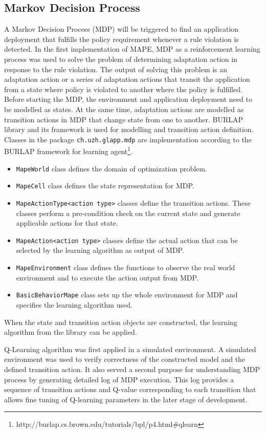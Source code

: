\documentclass{seal_thesis}
\begin{document}
\subsection{Markov Decision Process}\label{sec:mdp}
A Markov Decision Process (MDP) will be triggered to find an application deployment that fulfills the policy requirement whenever a rule violation is detected.
In the first implementation of MAPE, MDP as a reinforcement learning process was used to solve the problem of determining adaptation action in response to the rule violation.
The output of solving this problem is an adaptation action or a series of adaptation actions that transit the application from a state where policy is violated to another where the policy is fulfilled.
Before starting the MDP, the environment and application deployment need to be modelled as states.
At the same time, adaptation actions are modelled as transition actions in MDP that change state from one to another.
BURLAP library and its framework is used for modelling and transition action definition.
Classes in the package \texttt{ch.uzh.glapp.mdp} are implementation according to the BURLAP framework for learning agent\footnote{http://burlap.cs.brown.edu/tutorials/bpl/p4.html\#qlearn}.
\begin{itemize}
\item \texttt{MapeWorld} class defines the domain of optimization problem.
\item \texttt{MapeCell} class defines the state representation for MDP.
\item \texttt{MapeActionType<action type>} classes define the transition actions.
These classes perform a pre-condition check on the current state and generate applicable actions for that state.
\item \texttt{MapeAction<action type>} classes define the actual action that can be selected by the learning algorithm as output of MDP.
\item \texttt{MapeEnvironment} class defines the functions to observe the real world environment and to execute the action output from MDP.
\item \texttt{BasicBehaviorMape} class sets up the whole environment for MDP and specifies the learning algorithm used.
\end{itemize}
When the state and transition action objects are constructed, the learning algorithm from the library can be applied.

Q-Learning algorithm was first applied in a simulated environment.
A simulated environment was used to verify correctness of the constructed model and the defined transition action.
It also served a second purpose for understanding MDP process by generating detailed log of MDP execution.
This log provides a sequence of transition actions and Q-value corresponding to each transition that allows fine tuning of Q-learning parameters in the later stage of development.
\end{document}
